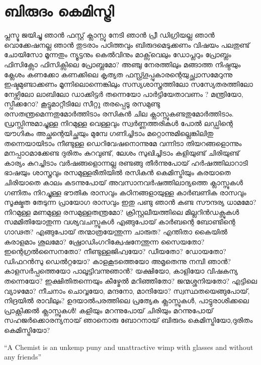 \chapter{ബിരുദം കെമിസ്ട്രി}
\obeylines
\noindent
പ്ലസ്ടു ജയിച്ചു ഞാൻ ഫസ്റ്റ് ക്ലാസ്സു നേടി ഞാൻ 
പ്രീ ഡിഗ്രിയല്ല ഞാൻ വൊക്കേഷനല്ല ഞാൻ 
തുടരാം പഠിത്തവും ബിരുദമെടുക്കണം  
വിഷയം പലതുണ്ട് ചോയിസോ മൂന്നതും 
ന്യൂട്ടനും കെൽവിനും  മാക്സ്‌വെലും  ഡോപ്ലറും   
പ്രോബ്ലം ഫിസിക്സോ ഫിസിക്സിലെ പ്രോബ്ലമോ? 
അഞ്ചു നേരത്തിലും മങ്ങാത്ത നിഷ്ഠയും 
ക്ലേശം കണക്കോ കണക്കിലെ കൃത്യത 
ഫസ്റ്റ്ഗ്രൂപ്പുകാരന്റെയുച്ഛ്വാസമേറുന്നു 
ഇഷ്ടമുണ്ടാക്കണം മൂന്നിലൊന്നെങ്കിലും 
സസ്യശാസ്ത്രത്തിലോ സസ്യേതരത്തിലോ 
നേഴ്സിലോ ലാബിലോ ഡാക്കിട്ടർ തന്നെയോ 
പാർട്ടിയേതാവണം ? മന്ത്രിയോ, സ്പീക്കറോ? 
കൂട്ടുമാറ്റീടിലേ സീറ്റു തരപ്പെടൂ
രസമുണ്ടു രസതന്ത്രമെന്നതുമോർത്തിടാം 
രസികൻ ചില ക്ലാസ്സുകണ്ടതുമോർത്തിടാം. 
ഡ്രസ്സിന്നുമാച്ചുള്ള നിറമുള്ള വെള്ളവും  
സ്വർണ്ണത്തരികൾ പോൽ ലഡ്ഡിന്റെ യൗഗികം  
അച്ഛന്റെയിച്ഛയും മുമ്പേ ഗണിച്ചിടാം  
മറ്റൊന്നുമില്ലെങ്കിലിതു തന്നെയായിടാം  
നീണ്ടുള്ള ഡെറിവേഷനൊന്നുമേ വന്നിടാ 
തിയറങ്ങളൊന്നും മനപ്പാഠമാക്കേണ്ട 
ദുരിതം കുറവുണ്ട്, ലേശം സുഖിച്ചിടാം  
കളിയുണ്ട് ചിരിയുണ്ട് കാര്യം കുറച്ചിടാം  
വർഷങ്ങളൊന്നല്ല രണ്ടങ്ങു തീർന്നുപോയ് 
ഹർഷത്തിലാറാടി ഭാഷയും ശാസ്ത്രവും 
രസമുള്ളരീതിയിൽ രസികൻ കെമിസ്ട്രിയും 
കരയാതെ ചിരിയാതെ കാലം കടന്നുപോയ് 
അവസാനവർഷത്തിലാദ്യത്തെ ക്ലാസ്സുകൾ 
ഗണിതം നിറച്ചുള്ള ഭൗതിക രാസവും 
കഠിനങ്ങളായുള്ള കാർബണിക രാസവും 
സൂക്ഷ്മത തേടുന്ന പ്രായോഗ രാസവും  
ഇതു പണ്ടു ഞാൻ കണ്ട സൗന്ദര്യ ധാമമോ?
നിറമുള്ള മണമുള്ള രസമുള്ളതന്ത്രമോ?
ക്രിസ്റ്റലീയത്തിലെ മില്ലറിൻഡക്സുകൾ  
സമമിതിയോതുന്ന വശ്യവചസ്സുകൾ    
എങ്ങുപോയ് കാർബന്റെ ബോണ്ടിന്റെ ഗാഢത? 
എങ്ങുപോയ് തന്മാത്രയേന്തുന്ന ചാരുത?  
എന്തിതാ കൈയിൽ കരാളമാം ശൂലമോ?
ഷ്രോഡിംഗറിക്വേഷനേന്തുന്ന സൈയതോ?  
ഇന്റെഗ്രൽസൈനതോ? നീണ്ടുള്ളജിഹ്വയോ?  
ഡീയതോ?  ഡോയതോ? ഡിഫറൻസു ഡെൽറ്റയോ?   
കാളകൂടത്തെയോ അമൃതെന്നു നമ്പി ഞാൻ? 
കാളസർപ്പത്തെയോ പാലൂട്ടിവന്നുഞാൻ? 
യക്ഷിയോ, കാളിയോ വിഷകന്യ തന്നെയോ? 
ഇക്ഷിതിതന്നെയും കീഴ്മേൽ മറിഞ്ഞിതോ? 
ജന്മശ്ശനിയതോ? എട്ടിലെ വ്യാഴമോ?  
നീചനാം ചൊവ്വയോ, മന്ദനോ, മാന്ദിയോ? 
സ്വസ്ഥതയെങ്ങുപോയ്, നിദ്രയിൽ രാവിലും? 
ഉദയാൽപരത്തിലെ പ്രത്യേക ക്ലാസ്സുകൾ, 
പാട്ടുരാശിക്കലെ പ്രാക്റ്റിക്കൽ ക്ലാസ്സുകൾ! 
കളിയും മറന്നുപോയ് ചിരിയും മറന്നുപോയ്
സഹജർക്കൊരന്യനായ് ഞാനൊരു ബോറനായ് 
ബിരുദം കെമിസ്ട്രിയോ,ദുരിതം കെമിസ്ട്രിയോ? 
\begin{center}
“A Chemist  is an unkemp puny and unattractive wimp 
with glasses and without any friends”
\end{center}

